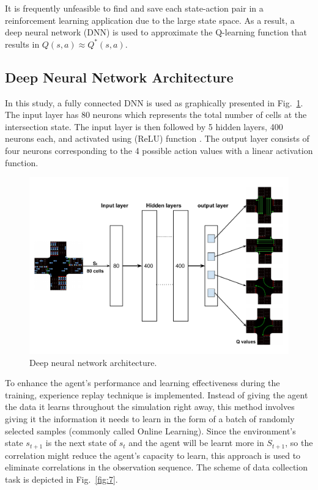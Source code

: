 \documentclass[conference]{IEEEtran}
\begin{document}
It is frequently unfeasible to find and save each state-action pair in a reinforcement learning application due to the large state space. As a result, a deep neural network (DNN) is used to approximate the Q-learning function that results in $Q(s, a) ≈ Q^*(s, a)$.

\subsection{Deep Neural Network Architecture}
In this study, a fully connected DNN is used as graphically presented in Fig.~\ref{fig:6}. The input layer has 80 neurons which represents the total number of cells at the intersection state. The input layer is then followed by 5 hidden layers, 400 neurons each, and activated using (ReLU) function \cite{ReLU}. The output layer consists of four neurons corresponding to the 4 possible action values with a linear activation function. 

\begin{figure}[!ht]
    \centering
    \begin{center}
    \includegraphics[scale=0.3]{images/DNN.pdf}
    \end{center}
    \caption{Deep neural network architecture.}
    \label{fig:6}
\end{figure}

To enhance the agent's performance and learning effectiveness during the training, experience replay\cite{replay} technique is implemented. Instead of giving the agent the data it learns throughout the simulation right away, this method involves giving it the information it needs to learn in the form of a batch of randomly selected samples (commonly called Online Learning). Since the environment's state $s_{t+1}$ is the next state of $s_t$ and the agent will be learnt more in $S_{t+1}$, so the correlation might reduce the agent's capacity to learn, this approach is used to eliminate correlations in the observation sequence. The scheme of data collection task is depicted in Fig.~\ref{fig:7}.
\end{document}
